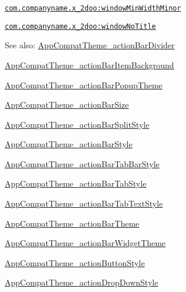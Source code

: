 {\tt \hyperlink{classandroid_1_1support_1_1v4_1_1_r_1_1styleable_43bc5686bdcae44e39f9c6bac931d7ea}{com.companyname.x\_\-2doo:windowMinWidthMinor}}

{\tt \hyperlink{classandroid_1_1support_1_1v4_1_1_r_1_1styleable_8b1c22084adcad0c0271c952798a1a61}{com.companyname.x\_\-2doo:windowNoTitle}}

\begin{Desc}
\item[See also:]\hyperlink{classandroid_1_1support_1_1v4_1_1_r_1_1styleable_a5d8289303e56212e5d12315d20673e4}{AppCompatTheme\_\-actionBarDivider} 

\hyperlink{classandroid_1_1support_1_1v4_1_1_r_1_1styleable_2f97502dea4ecbf53eeb7b290f197fed}{AppCompatTheme\_\-actionBarItemBackground} 

\hyperlink{classandroid_1_1support_1_1v4_1_1_r_1_1styleable_b8e3e3d79004f9d863d1f02f888e17e8}{AppCompatTheme\_\-actionBarPopupTheme} 

\hyperlink{classandroid_1_1support_1_1v4_1_1_r_1_1styleable_ee6703791177fb18457f6fa90659aad3}{AppCompatTheme\_\-actionBarSize} 

\hyperlink{classandroid_1_1support_1_1v4_1_1_r_1_1styleable_45e5a64b1e5eae0d6bd7742eb43a7c56}{AppCompatTheme\_\-actionBarSplitStyle} 

\hyperlink{classandroid_1_1support_1_1v4_1_1_r_1_1styleable_c3f864960381c66a243e748e86583219}{AppCompatTheme\_\-actionBarStyle} 

\hyperlink{classandroid_1_1support_1_1v4_1_1_r_1_1styleable_f88289a95a6edd4e037e864093455f6a}{AppCompatTheme\_\-actionBarTabBarStyle} 

\hyperlink{classandroid_1_1support_1_1v4_1_1_r_1_1styleable_d41958baadf80c6e15b8c8c98ee941f2}{AppCompatTheme\_\-actionBarTabStyle} 

\hyperlink{classandroid_1_1support_1_1v4_1_1_r_1_1styleable_638a87bf99ca4d6078c162044ec4dbbc}{AppCompatTheme\_\-actionBarTabTextStyle} 

\hyperlink{classandroid_1_1support_1_1v4_1_1_r_1_1styleable_2b2e4f39df58cecdc1b9bf54757c7e22}{AppCompatTheme\_\-actionBarTheme} 

\hyperlink{classandroid_1_1support_1_1v4_1_1_r_1_1styleable_1e7154e75762f816225eec7fd9d1ca7b}{AppCompatTheme\_\-actionBarWidgetTheme} 

\hyperlink{classandroid_1_1support_1_1v4_1_1_r_1_1styleable_4a5b2d32e9dd1e13e612b6d13ac23006}{AppCompatTheme\_\-actionButtonStyle} 

\hyperlink{classandroid_1_1support_1_1v4_1_1_r_1_1styleable_cea968e94c1465c9f1c390fe9de9567c}{AppCompatTheme\_\-actionDropDownStyle} 


\end{Desc}
